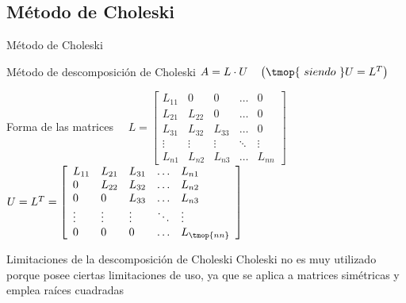 \documentclass [8pt] {beamer}
\begin{document}
    \subsection{Método de Choleski}
        \begin{frame}{Método de Choleski}
            \begin{block}{Método de descomposición de Choleski}
                { $A = L \cdot U \ \ \ \left(\tmop{\ siendo \ }U = L^T \right)$}
            \end{block}
            \begin{block}{Forma de las matrices}
                {\ \ $L = \left[ \begin{array}{lllll}
                L_{11} & 0 & 0 & \ldots & 0\\
                L_{21} & L_{22} & 0 & \ldots & 0\\
                L_{31} & L_{32} & L_{33} & \ldots & 0\\
                \vdots & \vdots & \vdots & \ddots & \vdots\\
                L_{n 1} & L_{n 2} & L_{n 3} & \ldots & L_{n n}
                \end{array} \right] $ \ \ \ \ \ \ \ \ \ \ \ $U = L^T = \left[ \begin{array}{lllll}
                L_{11} & L_{21} & L_{31} & \ldots & L_{n 1}\\
                0 & L_{22} & L_{32} & \ldots & L_{n 2}\\
                0 & 0 & L_{33} & \ldots & L_{n 3}\\
                \vdots & \vdots & \vdots & \ddots & \vdots\\
                0 & 0 & 0 & \ldots & L_{\tmop{nn}}
                \end{array} \right]$}
            \end{block}
            \begin{alertblock}{Limitaciones de la descomposición de Choleski}
                {Choleski no es muy utilizado porque posee ciertas limitaciones de uso, ya que se aplica a matrices simétricas y emplea raíces cuadradas }
            \end{alertblock}
        \end{frame}
\end{document}

